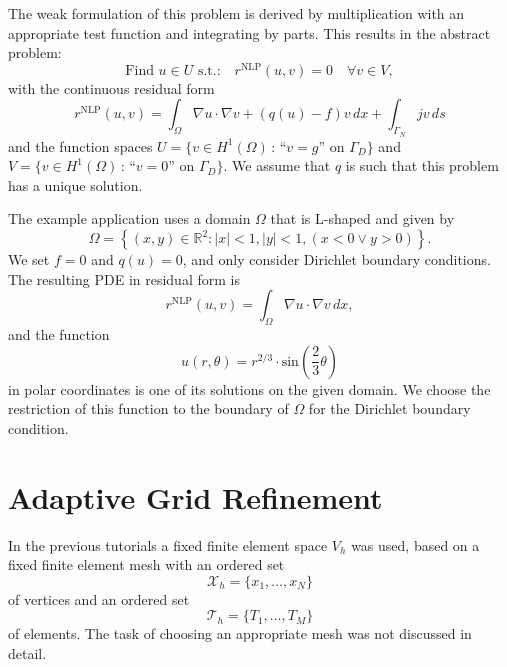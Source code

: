 \documentclass[a4paper,12pt]{article}
\begin{document}
The weak formulation of this problem is derived by multiplication with an appropriate
test function and integrating by parts. This results in the abstract problem:
\begin{equation}
\text{Find $u\in U$ s.t.:} \quad r^{\text{NLP}}(u,v)=0 \quad \forall v\in V,
\label{Eq:BasicBuildingBlock}
\end{equation}
with the continuous residual form
\begin{equation*}
r^{\text{NLP}}(u,v) = \int_\Omega \nabla u \cdot \nabla v + (q(u)-f)v\,dx + \int_{\Gamma_N} jv\,ds
\label{eq:ResidualForm}
\end{equation*}
and the function spaces 
$U= \{v\in H^1(\Omega) \,:\, \text{``$v=g$'' on $\Gamma_D$}\}$
and $V= \{v\in H^1(\Omega) \,:\, \text{``$v=0$'' on $\Gamma_D$}\}$. 
We assume that $q$ is such that this problem has a unique solution.

The example application uses a domain $\Omega$ that is L-shaped and given by
\begin{equation*}
  \Omega = \left\{ (x,y) \in \mathbb{R}^2 \colon |x| < 1, |y| < 1, (x < 0 \lor y > 0) \right\}.
\end{equation*}
We set $f = 0$ and $q(u) = 0$, and only consider Dirichlet boundary conditions.
The resulting PDE in residual form is
\begin{equation*}
r^{\text{NLP}}(u,v) = \int_\Omega \nabla u \cdot \nabla v \,dx,
\end{equation*}
and  the function
\begin{equation*}
  u(r,\theta) = r^{2/3} \cdot \text{sin}\left(\frac{2}{3} \theta\right)
\end{equation*}
in polar coordinates is one of its solutions on the given domain. We choose the restriction
of this function to the boundary of $\Omega$ for the Dirichlet boundary condition.

\section{Adaptive Grid Refinement} \label{Sec:AdaptiveRefinement}

In the previous tutorials a fixed finite element space $V_h$ was used, based on a fixed finite
element mesh with an ordered set
\begin{equation}
\mathcal{X}_h = \{x_1,\ldots,x_N\}
\end{equation}
of vertices and an ordered set 
\begin{equation}
\mathcal{T}_h = \{T_1, \ldots, T_M\}
\end{equation}
of elements. The task of choosing an appropriate mesh was not discussed in detail.
\end{document}

